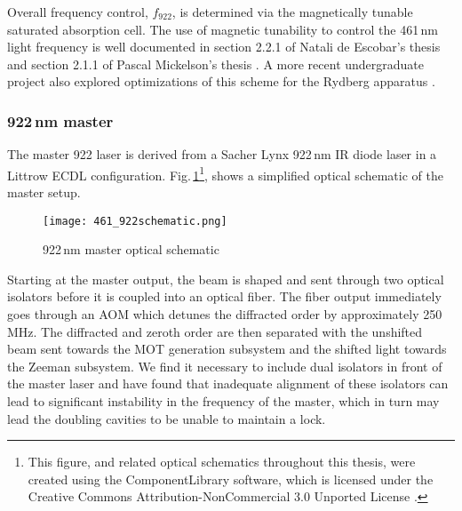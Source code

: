 Overall frequency control, $f_{922}$, is determined via the magnetically tunable saturated absorption cell.
The use of magnetic tunability to control the 461\,nm light frequency is well documented in section 2.2.1 of Natali de Escobar's thesis \cite{MartinezdeEscolar2010} and section 2.1.1 of Pascal Mickelson's thesis \cite{Mickelson2010b}.
A more recent undergraduate project also explored optimizations of this scheme for the Rydberg apparatus \cite{MichaelViray2014}.

\subsubsection{922\,nm master}
The master 922 laser is derived from a Sacher Lynx 922\,nm IR diode laser in a Littrow ECDL configuration.
Fig.\,\ref{fig:922optical}\footnote{This figure, and related optical schematics throughout this thesis, were created using the ComponentLibrary software, which is licensed under the Creative Commons Attribution-NonCommercial 3.0 Unported License \cite{Franzen}.}, shows a simplified optical schematic of the master setup.
	\begin{figure}
		\centerline{
		\texttt{[image: 461\_922schematic.png]}}
		\caption{922\,nm master optical schematic}
		\label{fig:922optical}
	\end{figure} 
	
Starting at the master output, the beam is shaped and sent through two optical isolators before it is coupled into an optical fiber.
The fiber output immediately goes through an AOM which detunes the diffracted order by approximately 250\,MHz.
The diffracted and zeroth order are then separated with the unshifted beam sent towards the MOT generation subsystem and the shifted light towards the Zeeman subsystem.
We find it necessary to include dual isolators in front of the master laser and have found that inadequate alignment of these isolators can lead to significant instability in the frequency of the master, which in turn may lead the doubling cavities to be unable to maintain a lock.

